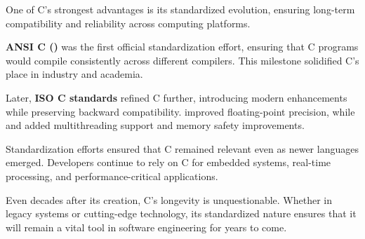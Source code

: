 \begin{NxSSSSBox}
	\begin{NxIDBox}
		One of C’s strongest advantages is its standardized evolution, ensuring long-term compatibility and reliability across computing platforms.
	\end{NxIDBox}
	\begin{NxIDBox}
		\textbf{ANSI C ()} was the first official standardization effort, ensuring that C programs would compile consistently across different compilers. This milestone solidified C’s place in industry and academia.
	\end{NxIDBox}
	\begin{NxIDBox}
	Later, \textbf{ISO C standards} refined C further, introducing modern enhancements while preserving backward compatibility.  improved floating-point precision, while  and  added multithreading support and memory safety improvements.
	\end{NxIDBox}
	\begin{NxIDBox}
		Standardization efforts ensured that C remained relevant even as newer languages emerged. Developers continue to rely on C for embedded systems, real-time processing, and performance-critical applications.
	\end{NxIDBox}
	\begin{NxIDBox}
		Even decades after its creation, C’s longevity is unquestionable. Whether in legacy systems or cutting-edge technology, its standardized nature ensures that it will remain a vital tool in software engineering for years to come.
	\end{NxIDBox}
\end{NxSSSSBox}

